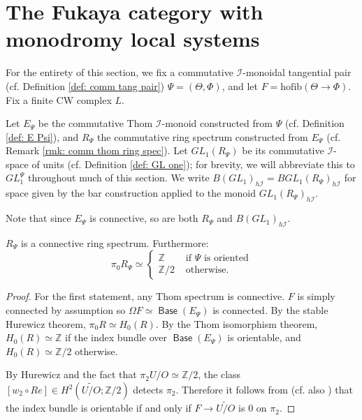 \documentclass{TPmod}
\newcommand{\hofib}{\mathrm{hofib}}
\def\bZ{\mathbb{Z}}
\DeclareMathOperator{\Base}{\mathsf{Base}}
\newcommand{\cI}{\mathcal{I}}
\def\bZ{\mathbb{Z}}
\renewcommand{\cong}{\simeq}
\numberwithin{equation}{section}
\begin{document}
\section{The Fukaya category with monodromy local systems}\label{sec: mon loco sys}

    For the entirety of this section, we fix a commutative $\cI$-monoidal tangential pair (cf. Definition \ref{def: comm tang pair}) $\Psi = (\Theta, \Phi)$, and let $F = \hofib(\Theta \to \Phi)$. Fix a finite CW complex $L$.

    Let $E_\Psi$ be the commutative Thom $\cI$-monoid constructed from $\Psi$ (cf. Definition \ref{def: E Psi}), and $R_\Psi$ the commutative ring spectrum constructed from $E_\Psi$ (cf. Remark \ref{rmk: comm thom ring spec}). Let $GL_1(R_\Psi)$ be its commutative $\cI$-space of units (cf. Definition \ref{def: GL one}); for brevity, we will abbreviate this to $GL_1^\Psi$ throughout much of this section. We write $B(GL_1)_{h\cI}=BGL_1(R_\Psi)_{h\cI}$ for space given by the bar construction applied to the monoid $GL_1(R_\Psi)_{h\cI}$.


    Note that since $E_\Psi$ is connective, so are both $R_\Psi$ and $B(GL_1)_{h\cI}$.

    \begin{lem}\label{lem: pi zero R}
        $R_\Psi$ is a connective ring spectrum. Furthermore:
        \begin{equation}
            \pi_0 R_\Psi \cong \begin{cases}
                \bZ & \textrm{ if $\Psi$ is oriented} \\
                \bZ/2 & \textrm{ otherwise.}
            \end{cases}
        \end{equation}
    \end{lem}
    \begin{proof}
        For the first statement, any Thom spectrum is connective. $F$ is simply connected by assumption so $\Omega F \simeq \Base(E_\Psi)$ is connected. By the stable Hurewicz theorem, $\pi_0 R \cong H_0(R)$. By the Thom isomorphism theorem, $H_0(R) \cong \bZ$ if the index bundle over $\Base(E_\Psi)$ is orientable, and $H_0(R) \cong \bZ/2$ otherwise. 

        By Hurewicz and the fact that $\pi_2 U/O \cong \bZ/2$, the class $[w_2 \circ Re] \in H^2(\widetilde{U/O}; \bZ/2)$ detects $\pi_2$. Therefore it follows from \cite[Theorem 1.1]{Georgieva} (cf. also \cite[Section 3]{deSilva}) that the index bundle is orientable if and only if $F \to \widetilde{U/O}$ is 0 on $\pi_2$.
    \end{proof}
\end{document}
